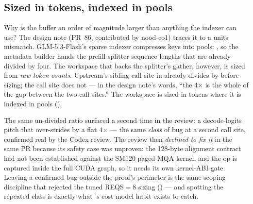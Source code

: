 \subsection{Sized in tokens, indexed in pools}

Why is the buffer an order of magnitude larger than anything the indexer can
use? The
design note  (PR~86, contributed by
nood-co1) traces it to a units mismatch. GLM-5.3-Flash's sparse indexer
compresses keys into pools: , so the
metadata builder hands the prefill splitter sequence lengths that are already
divided by four. The workspace that backs the splitter's gather, however, is
sized from \emph{raw token counts}. Upstream's sibling call site in
 already divides by 
before sizing; the  call site does not ---
in the design note's words, ``the 4$\times$ is the whole of the gap between the
two call sites.'' The workspace is sized in tokens where it is indexed in
pools ().

The same un-divided ratio surfaced a
second time in the review: a decode-logits pitch that over-strides by a flat
4$\times$ --- the same \emph{class} of bug at a second call site, confirmed
real by the Codex review. The review then \emph{declined to fix it} in the
same PR because its safety case was unproven: the 128-byte alignment
contract had not been established against the SM120 paged-MQA kernel, and
the op is captured inside the full CUDA graph, so it needs its own
kernel-ABI gate.
Leaving a confirmed bug outside the proof's perimeter is the same scoping
discipline that rejected the tuned REQS${=}8$ sizing
() --- and spotting the repeated class is
exactly what 's cost-model habit exists to catch.

